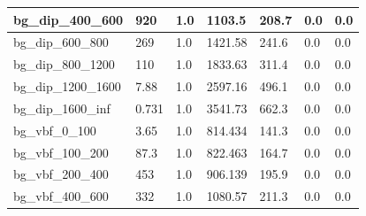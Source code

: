 \documentclass[a4paper, 10pt]{article}
\begin{document}
\begin{table}[H]
\begin{center}
\begin{tabular}{|m{23.0mm}|m{23.0mm}|m{18.0mm}|m{19.0mm}|m{19.0mm}|m{19.0mm}|m{19.0mm}|}
      \hline
      {\cellcolor{white}         bg\_dip\_400\_600}& {\cellcolor{white}         920}& {\cellcolor{white}         1.0}& {\cellcolor{white}         1103.5}& {\cellcolor{white}         208.7}& {\cellcolor{green}         0.0}& {\cellcolor{green}         0.0}\\
      \hline
      {\cellcolor{white}         bg\_dip\_600\_800}& {\cellcolor{white}         269}& {\cellcolor{white}         1.0}& {\cellcolor{white}         1421.58}& {\cellcolor{white}         241.6}& {\cellcolor{green}         0.0}& {\cellcolor{green}         0.0}\\
      \hline
      {\cellcolor{white}         bg\_dip\_800\_1200}& {\cellcolor{white}         110}& {\cellcolor{white}         1.0}& {\cellcolor{white}         1833.63}& {\cellcolor{white}         311.4}& {\cellcolor{green}         0.0}& {\cellcolor{green}         0.0}\\
      \hline
      {\cellcolor{white}         bg\_dip\_1200\_1600}& {\cellcolor{white}         7.88}& {\cellcolor{white}         1.0}& {\cellcolor{white}         2597.16}& {\cellcolor{white}         496.1}& {\cellcolor{green}         0.0}& {\cellcolor{green}         0.0}\\
      \hline
      {\cellcolor{white}         bg\_dip\_1600\_inf}& {\cellcolor{white}         0.731}& {\cellcolor{white}         1.0}& {\cellcolor{white}         3541.73}& {\cellcolor{white}         662.3}& {\cellcolor{green}         0.0}& {\cellcolor{green}         0.0}\\
      \hline
      {\cellcolor{white}         bg\_vbf\_0\_100}& {\cellcolor{white}         3.65}& {\cellcolor{white}         1.0}& {\cellcolor{white}         814.434}& {\cellcolor{white}         141.3}& {\cellcolor{green}         0.0}& {\cellcolor{green}         0.0}\\
      \hline
      {\cellcolor{white}         bg\_vbf\_100\_200}& {\cellcolor{white}         87.3}& {\cellcolor{white}         1.0}& {\cellcolor{white}         822.463}& {\cellcolor{white}         164.7}& {\cellcolor{green}         0.0}& {\cellcolor{green}         0.0}\\
      \hline
      {\cellcolor{white}         bg\_vbf\_200\_400}& {\cellcolor{white}         453}& {\cellcolor{white}         1.0}& {\cellcolor{white}         906.139}& {\cellcolor{white}         195.9}& {\cellcolor{green}         0.0}& {\cellcolor{green}         0.0}\\
      \hline
      {\cellcolor{white}         bg\_vbf\_400\_600}& {\cellcolor{white}         332}& {\cellcolor{white}         1.0}& {\cellcolor{white}         1080.57}& {\cellcolor{white}         211.3}& {\cellcolor{green}         0.0}& {\cellcolor{green}         0.0}\\

\end{tabular}
\end{center}
\end{table}
\end{document}
